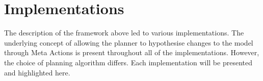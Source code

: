 \section{Implementations}
The description of the framework above led to various implementations. The underlying concept of allowing the planner to hypothesise changes to the model through Meta Actions is present throughout all of the implementations. However, the choice of planning algorithm differs. Each implementation will be presented and highlighted here.
